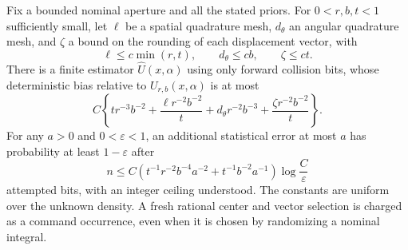 \begin{lemma}
\label{lem:single-weak-sampling}
Fix a bounded nominal aperture and all the stated priors.  For
$0<r,b,t<1$ sufficiently small, let $\ell$ be a spatial quadrature
mesh, $d_\theta$ an angular quadrature mesh, and $\zeta$ a bound on
the rounding of each displacement vector, with
\[
 \ell\le c\min(r,t),\qquad d_\theta\le cb,\qquad \zeta\le ct.
\]
There is a finite estimator $\widehat U(x,\alpha)$ using only forward
collision bits, whose deterministic bias relative to
$U_{r,b}(x,\alpha)$ is at most
\begin{equation}\label{eq:single-weak-bias}
 C\left\{tr^{-3}b^{-2}
       +\frac{\ell r^{-2}b^{-2}}t
       +d_\theta r^{-2}b^{-3}
       +\frac{\zeta r^{-2}b^{-2}}t\right\}.
\end{equation}
For any $a>0$ and $0<\varepsilon<1$, an additional statistical error
at most $a$ has probability at least $1-\varepsilon$ after
\begin{equation}\label{eq:single-weak-cost}
 n\le C\left(t^{-1}r^{-2}b^{-4}a^{-2}
                  +t^{-1}b^{-2}a^{-1}\right)
                    \log\frac{C}{\varepsilon}
\end{equation}
attempted bits, with an integer ceiling understood.  The constants
are uniform over the unknown density.  A fresh rational center and
vector selection is charged as a command occurrence, even when it
is chosen by randomizing a nominal integral.
\end{lemma}
